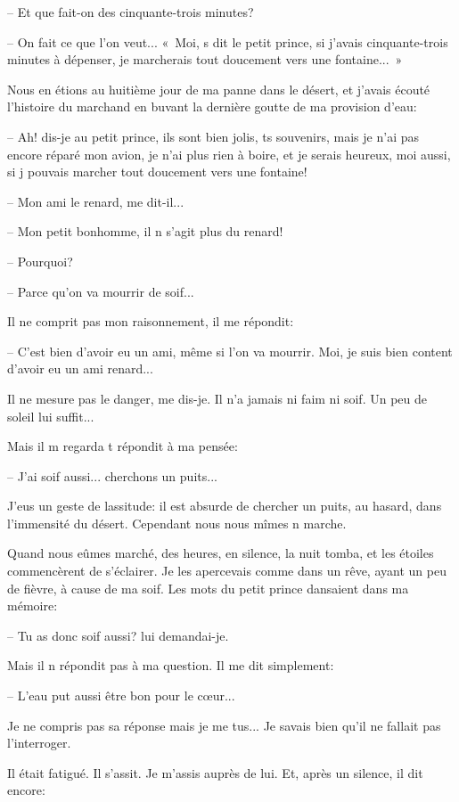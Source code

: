 \documentclass[a4paper]{report}
\begin{document}
-- Et que fait-on des cinquante-trois minutes?

-- On fait ce que l'on veut...
«~Moi, s dit le petit prince, si j'avais cinquante-trois minutes à dépenser, je marcherais tout doucement vers une fontaine...~»


\parachapter{} %
Nous en étions au huitième jour de ma panne dans le désert, et j'avais écouté l'histoire du marchand en buvant la dernière goutte de ma provision d'eau:

-- Ah! dis-je au petit prince, ils sont bien jolis, ts souvenirs, mais je n'ai pas encore réparé mon avion, je n'ai plus rien à boire, et je serais heureux, moi aussi, si j pouvais marcher tout doucement vers une fontaine!

-- Mon ami le renard, me dit-il...

-- Mon petit bonhomme, il n s'agit plus du renard!

-- Pourquoi?

-- Parce qu'on va mourrir de soif...

Il ne comprit pas mon raisonnement, il me répondit:

-- C'est bien d'avoir eu un ami, même si l'on va mourrir. Moi, je suis bien content d'avoir eu un ami renard...

Il ne mesure pas le danger, me dis-je. Il n'a jamais ni faim ni soif. Un peu de soleil lui suffit...

Mais il m regarda t répondit à ma pensée:

-- J'ai soif aussi... cherchons un puits...

J'eus un geste de lassitude: il est absurde de chercher un puits, au hasard, dans l'immensité du désert. Cependant nous nous mîmes n marche.

Quand nous eûmes marché, des heures, en silence, la nuit tomba, et les étoiles commencèrent de s'éclairer. Je les apercevais comme dans un rêve, ayant un peu de fièvre, à cause de ma soif. Les mots du petit prince dansaient dans ma mémoire:

-- Tu as donc soif aussi? lui demandai-je.

Mais il n répondit pas à ma question. Il me dit simplement:

-- L'eau put aussi être bon pour le cœur...

Je ne compris pas sa réponse mais je me tus... Je savais bien qu'il ne fallait pas l'interroger.

Il était fatigué. Il s'assit. Je m'assis auprès de lui. Et, après un silence, il dit encore:
\end{document}

